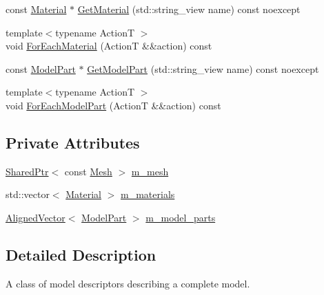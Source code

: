 \begin{DoxyCompactItemize}
\item 
const \mbox{\hyperlink{classmage_1_1rendering_1_1_material}{Material}} $\ast$ \mbox{\hyperlink{classmage_1_1rendering_1_1_model_descriptor_a57a444cf8c1310ce8fa4b797055e0fd1}{Get\+Material}} (std\+::string\+\_\+view name) const noexcept
\item 
{\footnotesize template$<$typename ActionT $>$ }\\void \mbox{\hyperlink{classmage_1_1rendering_1_1_model_descriptor_a4e95ae12e0c952c76aaaf1ee457aed07}{For\+Each\+Material}} (ActionT \&\&action) const
\item 
const \mbox{\hyperlink{structmage_1_1rendering_1_1_model_part}{Model\+Part}} $\ast$ \mbox{\hyperlink{classmage_1_1rendering_1_1_model_descriptor_a3a10002efd6bfdc701f5fc27c54d441f}{Get\+Model\+Part}} (std\+::string\+\_\+view name) const noexcept
\item 
{\footnotesize template$<$typename ActionT $>$ }\\void \mbox{\hyperlink{classmage_1_1rendering_1_1_model_descriptor_a9b217d2536bdd34c4b8b93ccf2ef62d3}{For\+Each\+Model\+Part}} (ActionT \&\&action) const
\end{DoxyCompactItemize}
\subsection*{Private Attributes}
\begin{DoxyCompactItemize}
\item 
\mbox{\hyperlink{namespacemage_a1e01ae66713838a7a67d30e44c67703e}{Shared\+Ptr}}$<$ const \mbox{\hyperlink{classmage_1_1rendering_1_1_mesh}{Mesh}} $>$ \mbox{\hyperlink{classmage_1_1rendering_1_1_model_descriptor_a18fd5970f038726fd200e60f3c5ad33e}{m\+\_\+mesh}}
\item 
std\+::vector$<$ \mbox{\hyperlink{classmage_1_1rendering_1_1_material}{Material}} $>$ \mbox{\hyperlink{classmage_1_1rendering_1_1_model_descriptor_ae88269763478f47e5d6c0086a4aeb33b}{m\+\_\+materials}}
\item 
\mbox{\hyperlink{namespacemage_a8664bfb5ce2179fc64eae9f82c8a5ba8}{Aligned\+Vector}}$<$ \mbox{\hyperlink{structmage_1_1rendering_1_1_model_part}{Model\+Part}} $>$ \mbox{\hyperlink{classmage_1_1rendering_1_1_model_descriptor_a2c2eda62e6f2c7f6274a0f829b6abfa1}{m\+\_\+model\+\_\+parts}}
\end{DoxyCompactItemize}


\subsection{Detailed Description}
A class of model descriptors describing a complete model. 

